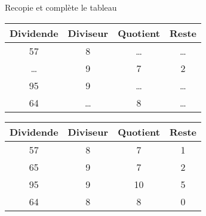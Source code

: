 Recopie et complète le tableau \\
\begin{center}
\begin{tabular}{|c|c|c|c|}
\hline
\multicolumn{1}{|c|}{\textbf{Dividende}}&\multicolumn{1}{c|}{\textbf{Diviseur}}&\multicolumn{1}{c|}{\textbf{Quotient}}&\multicolumn{1}{c|}{\textbf{Reste}}\\\hline
57&8&\dots&\ldots\\
\hline
\ldots&9&7&2\\
\hline
95&9&\ldots&\ldots\\
\hline
64&\ldots&8&\ldots\\
\hline
\end{tabular}
\end{center}
\begin{center}
\begin{tabular}{|c|c|c|c|}
\hline
\textbf{Dividende}&\textbf{Diviseur}&\textbf{Quotient}&\textbf{Reste}\\
\hline
57&8&7&1\\
\hline
65&9&7&2\\
\hline
95&9&10&5\\
\hline
64&8&8&0\\
\hline
\end{tabular}
\end{center}